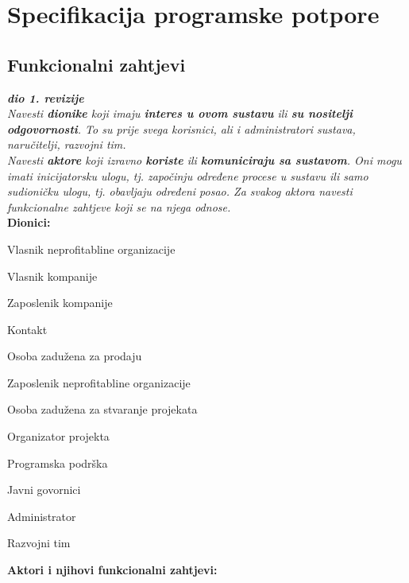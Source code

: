 \chapter{Specifikacija programske potpore}
		
	\section{Funkcionalni zahtjevi}
			
			\textbf{\textit{dio 1. revizije}}\\
			
			\textit{Navesti \textbf{dionike} koji imaju \textbf{interes u ovom sustavu} ili  \textbf{su nositelji odgovornosti}. To su prije svega korisnici, ali i administratori sustava, naručitelji, razvojni tim.}\\
				
			\textit{Navesti \textbf{aktore} koji izravno \textbf{koriste} ili \textbf{komuniciraju sa sustavom}. Oni mogu imati inicijatorsku ulogu, tj. započinju određene procese u sustavu ili samo sudioničku ulogu, tj. obavljaju određeni posao. Za svakog aktora navesti funkcionalne zahtjeve koji se na njega odnose.}\\
			
			
			\noindent \textbf{Dionici:}
			
			\begin{packed_enum}
				
				\item Vlasnik neprofitabline organizacije
				\item Vlasnik kompanije
				\item Zaposlenik kompanije
					\item Kontakt
					\item Osoba zadužena za prodaju
				\item Zaposlenik neprofitabline organizacije
					\item Osoba zadužena za stvaranje projekata
					\item Organizator projekta
					\item Programska podrška
					\item Javni govornici
				\item Administrator
				\item Razvojni tim
				
			\end{packed_enum}
			
			\noindent \textbf{Aktori i njihovi funkcionalni zahtjevi:}
			
